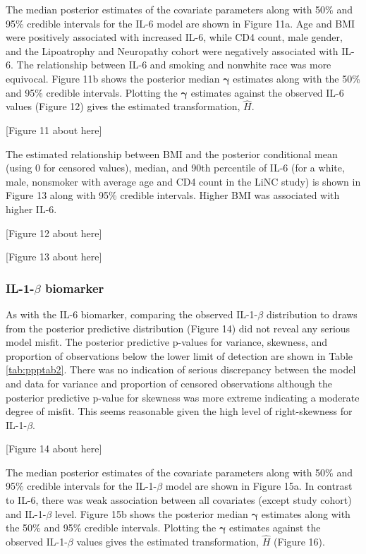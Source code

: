 \documentclass[
]{article}
\begin{document}
The median posterior estimates of the covariate parameters along with 50\% and 95\% credible intervals for the IL-6 model are shown in Figure 11a. Age and BMI were positively associated with increased IL-6, while CD4 count, male gender, and the Lipoatrophy and Neuropathy cohort were negatively associated with IL-6. The relationship between IL-6 and smoking and nonwhite race was more equivocal. Figure 11b shows the posterior median \(\boldsymbol{\gamma}\) estimates along with the 50\% and 95\% credible intervals. Plotting the \(\boldsymbol{\gamma}\) estimates against the observed IL-6 values (Figure 12) gives the estimated transformation, \(\hat{H}\).

{[}Figure 11 about here{]}

The estimated relationship between BMI and the posterior conditional mean (using 0 for censored values), median, and 90th percentile of IL-6 (for a white, male, nonsmoker with average age and CD4 count in the LiNC study) is shown in Figure 13 along with 95\% credible intervals. Higher BMI was associated with higher IL-6.

{[}Figure 12 about here{]}

{[}Figure 13 about here{]}

\hypertarget{il-1-beta-biomarker}{%
\subsubsection{\texorpdfstring{IL-1-\(\beta\) biomarker}{IL-1-\textbackslash beta biomarker}}\label{il-1-beta-biomarker}}

As with the IL-6 biomarker, comparing the observed IL-1-\(\beta\) distribution to draws from the posterior predictive distribution (Figure 14) did not reveal any serious model misfit. The posterior predictive p-values for variance, skewness, and proportion of observations below the lower limit of detection are shown in Table \ref{tab:ppptab2}. There was no indication of serious discrepancy between the model and data for variance and proportion of censored observations although the posterior predictive p-value for skewness was more extreme indicating a moderate degree of misfit. This seems reasonable given the high level of right-skewness for IL-1-\(\beta\).

{[}Figure 14 about here{]}

The median posterior estimates of the covariate parameters along with 50\% and 95\% credible intervals for the IL-1-\(\beta\) model are shown in Figure 15a. In contrast to IL-6, there was weak association between all covariates (except study cohort) and IL-1-\(\beta\) level. Figure 15b shows the posterior median \(\boldsymbol{\gamma}\) estimates along with the 50\% and 95\% credible intervals. Plotting the \(\boldsymbol{\gamma}\) estimates against the observed IL-1-\(\beta\) values gives the estimated transformation, \(\hat{H}\) (Figure 16).
\end{document}

